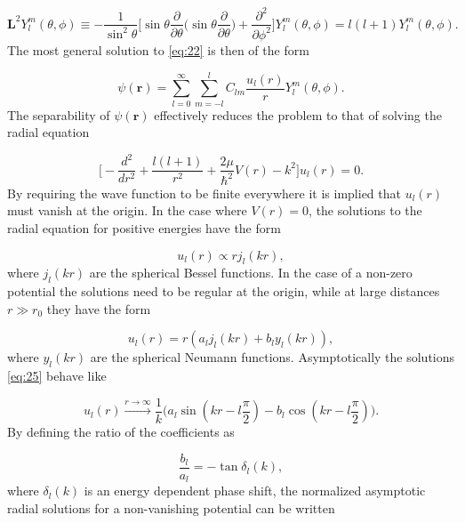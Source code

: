 \begin{equation}
\mathbf{L}^2 Y_l^m(\theta,\phi) \equiv -\frac{1}{ \sin^2\theta} \bigg[ \sin\theta \frac{\partial}{\partial\theta} \bigg(\sin\theta \frac{\partial}{\partial\theta}\bigg) +  \frac{\partial^2}{\partial\phi^2}\bigg] Y_l^m(\theta,\phi) = l(l+1)Y_l^m(\theta,\phi).
\end{equation}
The most general solution to \eqref{eq:22} is then of the form

\begin{equation}\label{eq:32}
\psi(\mathbf{r}) = \sum_{l=0}^{\infty} \sum_{m = -l}^{l} C_{lm}\frac{u_{l}(r)}{r}Y_l^m(\theta,\phi).
\end{equation}
The separability of $\psi(\mathbf{r})$ effectively reduces the problem to that of solving the radial equation

\begin{equation} \label{eq:24}
\bigg[-\frac{d^2}{dr^2} + \frac{l(l+1)}{r^2} + \frac{2\mu}{\hbar^2}V(r) - k^2\bigg]u_l(r) = 0.
\end{equation}
By requiring the wave function to be finite  everywhere it is implied that $u_l(r)$ must vanish at the origin. In the case where $V(r) = 0$, the solutions to the radial equation for positive energies have the form

\begin{equation}\label{eq:zero}
u_l(r) \propto r j_l(kr),
\end{equation}
where $j_l(kr)$ are the spherical Bessel functions. In the case of a non-zero potential the solutions need to be regular at the origin, while at large distances $r \gg r_0$ they have the form

\begin{equation}\label{eq:25}
u_l(r) = r(a_l j_l(kr)+b_l y_l(kr)),
\end{equation} 
where $y_l(kr)$ are the spherical Neumann functions. Asymptotically the solutions \eqref{eq:25} behave like

\begin{equation}
u_l(r) \xrightarrow{r\to\infty} \frac{1}{k}\big(a_l \sin(kr - l\frac{\pi}{2})-b_l \cos(kr - l\frac{\pi}{2})\big).
\end{equation} 
By defining the ratio of the coefficients as

\begin{equation}\label{eq:tan}
\frac{b_l}{a_l} = -\tan\delta_l(k),
\end{equation} 
where $\delta_l(k)$ is an energy dependent phase shift, the normalized asymptotic radial solutions for a non-vanishing potential can be written

